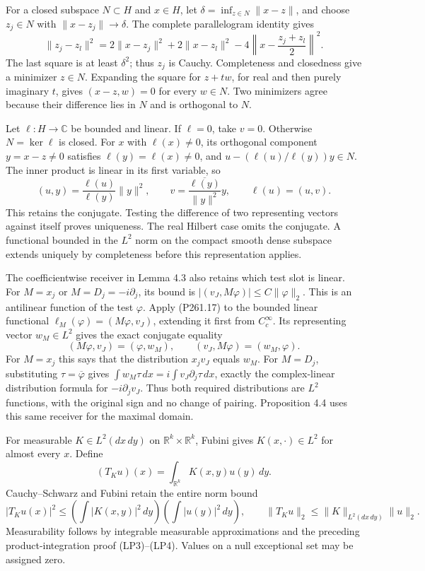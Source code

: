 \documentclass[
  11pt,
]{article}
\begin{document}
For a closed subspace \(N\subset H\) and \(x\in H\), let
\(\delta=\inf_{z\in N}\|x-z\|\), and choose \(z_j\in N\) with
\(\|x-z_j\|\to\delta\). The complete parallelogram identity gives \[
 \|z_j-z_l\|^2
 =2\|x-z_j\|^2+2\|x-z_l\|^2
 -4\left\|x-\frac{z_j+z_l}{2}\right\|^2.
 \tag{P261.16}
\] The last square is at least \(\delta^2\); thus \(z_j\) is Cauchy.
Completeness and closedness give a minimizer \(z\in N\). Expanding the
square for \(z+tw\), for real and then purely imaginary \(t\), gives
\((x-z,w)=0\) for every \(w\in N\). Two minimizers agree because their
difference lies in \(N\) and is orthogonal to \(N\).

Let \(\ell:H\to\mathbb C\) be bounded and linear. If \(\ell=0\), take
\(v=0\). Otherwise \(N=\ker\ell\) is closed. For \(x\) with
\(\ell(x)\ne0\), its orthogonal component \(y=x-z\ne0\) satisfies
\(\ell(y)=\ell(x)\ne0\), and \(u-(\ell(u)/\ell(y))y\in N\). The inner
product is linear in its first variable, so \[
 (u,y)=\frac{\ell(u)}{\ell(y)}\|y\|^2,\qquad
 v=\frac{\overline{\ell(y)}}{\|y\|^2}y,\qquad
 \ell(u)=(u,v).
 \tag{P261.17}
\] This retains the conjugate. Testing the difference of two
representing vectors against itself proves uniqueness. The real Hilbert
case omits the conjugate. A functional bounded in the \(L^2\) norm on
the compact smooth dense subspace extends uniquely by completeness
before this representation applies.

The coefficientwise receiver in Lemma 4.3 also retains which test slot
is linear. For \(M=x_j\) or \(M=D_j=-i\partial_j\), its bound is
\(|(v_J,M\varphi)|\le C\|\varphi\|_2\). This is an antilinear function
of the test \(\varphi\). Apply (P261.17) to the bounded linear
functional \(\ell_M(\varphi)=(M\varphi,v_J)\), extending it first from
\(C_c^\infty\). Its representing vector \(w_M\in L^2\) gives the exact
conjugate equality \[
 (M\varphi,v_J)=(\varphi,w_M),\qquad
 (v_J,M\varphi)=(w_M,\varphi).
\] For \(M=x_j\) this says that the distribution \(x_jv_J\) equals
\(w_M\). For \(M=D_j\), substituting \(\tau=\overline\varphi\) gives
\(\int w_M\tau\,dx=i\int v_J\partial_j\tau\,dx\), exactly the
complex-linear distribution formula for \(-i\partial_jv_J\). Thus both
required distributions are \(L^2\) functions, with the original sign and
no change of pairing. Proposition 4.4 uses this same receiver for the
maximal domain.

For measurable \(K\in L^2(dx\,dy)\) on \(\mathbb R^k\times\mathbb R^k\),
Fubini gives \(K(x,\cdot)\in L^2\) for almost every \(x\). Define \[
 (T_Ku)(x)=\int_{\mathbb R^k}K(x,y)u(y)\,dy.
\] Cauchy--Schwarz and Fubini retain the entire norm bound \[
 |T_Ku(x)|^2\le
 \left(\int |K(x,y)|^2\,dy\right)\left(\int |u(y)|^2\,dy\right),
 \qquad \|T_Ku\|_2\le\|K\|_{L^2(dx\,dy)}\|u\|_2.
 \tag{P261.18}
\] Measurability follows by integrable measurable approximations and the
preceding product-integration proof (LP3)--(LP4). Values on a null
exceptional set may be assigned zero.
\end{document}
